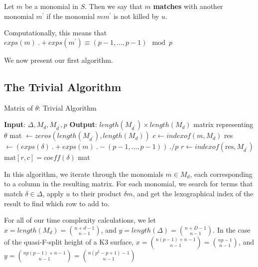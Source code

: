 \begin{defn}
	Let \(m\) be a monomial in \(S\). 
	Then we say that \(m\) \textbf{matches}
	with another monomial \(m^{\prime}\) 
	if the monomial \(mm^{\prime}\) is
	not killed by \(u\).
\end{defn}

Computationally, this means that $exps(m) ~.+ exps(m^{\prime}) \equiv (p - 1, \dots, p - 1) \mod p$

We now present our first algorithm.


\subsection{The Trivial Algorithm}

\begin{algorithm}[H]
    \caption{Matrix of $\theta$: Trivial Algorithm}
    \label{alg:matrix:trivial}
    \begin{algorithmic}[1]
    \State \textbf{Input}: $\Delta, M_{d}, M_{d^{\prime}}, p$
    \State \textbf{Output}: $length(M_{d^{\prime}}) \times length(M_{d})$ 
	matrix representing $\theta$
    \State mat $\gets zeros(length(M_{d^{\prime}}), length(M_{d}))$
	    \State $c \gets indexof(m, M _{d})$
        \For{$\delta \in \Delta$}
             
			\State res $\gets (exps(\delta) ~.+ exps(m) ~.- (p-1, \ldots, p-1)) ~./ p$ 
				\State $r \gets indexof(\text{res},M_{d^{\prime}})$
                \State $\text{mat}[r, c] = coeff(\delta)$
            \EndIf
        \EndFor
    \EndFor
    \State \Return mat
    \end{algorithmic}
\end{algorithm}

In this algorithm, we iterate through the monomials $m \in M_{d}$, each corresponding to a column in the
resulting matrix. For each monomial, we search for terms that match $\delta \in \Delta$, apply $u$ to their product $\delta m$, and 
get the lexographical index of the result to find which row to add to.

For all of our time complexity calculations, we let $x = length(M_{d}) = \binom{n + d - 1}{n - 1}$, and $y = length(\Delta) = \binom{n + D - 1}{n - 1}$.
In the case of the quasi-F-split height of a K3 surface, $x = \binom{n(p - 1) + n - 1}{n - 1} = \binom{np - 1}{n - 1}$, and $y = \binom{np(p - 1) + n - 1}{n - 1} = \binom{n(p^2 - p + 1) - 1}{n - 1}$


